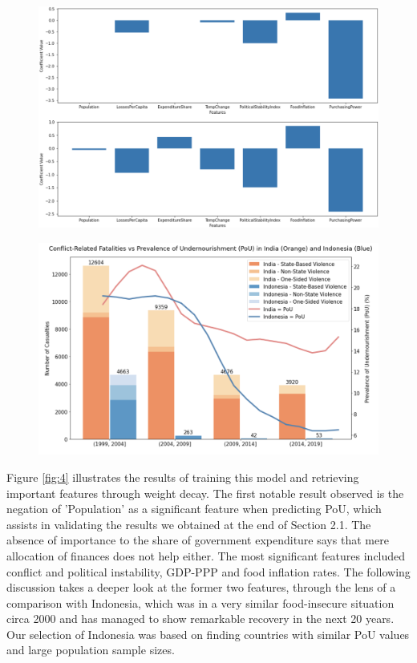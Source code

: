 \documentclass{article}
\begin{document}
\begin{figure}[b]
\begin{minipage}{.48\textwidth}
  \centering
  \includegraphics[width=\textwidth, left]{regression_results}
  \label{fig:4}
\end{minipage}%
\hfill
\begin{minipage}{.48\textwidth}
  \centering
  \includegraphics[width=\textwidth, right]{conflict}
  \label{fig:5}
\end{minipage}
\end{figure}

Figure \ref{fig:4} illustrates the results of training this model and retrieving important features through weight decay. The first notable result observed is the negation of 'Population' as a significant feature when predicting PoU, which assists in validating the results we obtained at the end of Section 2.1. The absence of importance to the share of government expenditure says that mere allocation of finances does not help either. The most significant features included conflict and political instability, GDP-PPP and food inflation rates. The following discussion takes a deeper look at the former two features, through the lens of a comparison with Indonesia, which was in a very similar food-insecure situation circa 2000 and has managed to show remarkable recovery in the next 20 years. Our selection of Indonesia was based on finding countries with similar PoU values and large population sample sizes.
\end{document}
